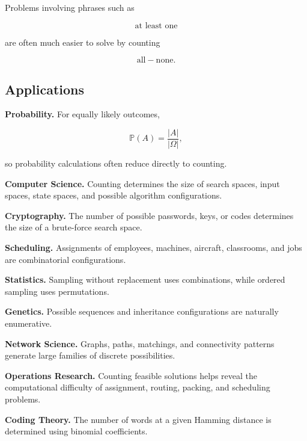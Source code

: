 Problems involving phrases such as

\[
\text{at least one}
\]

are often much easier to solve by counting

\[
\text{all}
-
\text{none}.
\]

\subsection{Applications}
\label{subsec:basic-counting-applications}

\begin{applicationbox}

\textbf{Probability.}
For equally likely outcomes,

\[
\mathbb{P}(A)
=
\frac{|A|}{|\Omega|},
\]

so probability calculations often reduce directly to counting.

\medskip

\textbf{Computer Science.}
Counting determines the size of search spaces, input spaces, state
spaces, and possible algorithm configurations.

\medskip

\textbf{Cryptography.}
The number of possible passwords, keys, or codes determines the size of
a brute-force search space.

\medskip

\textbf{Scheduling.}
Assignments of employees, machines, aircraft, classrooms, and jobs are
combinatorial configurations.

\medskip

\textbf{Statistics.}
Sampling without replacement uses combinations, while ordered sampling
uses permutations.

\medskip

\textbf{Genetics.}
Possible sequences and inheritance configurations are naturally
enumerative.

\medskip

\textbf{Network Science.}
Graphs, paths, matchings, and connectivity patterns generate large
families of discrete possibilities.

\medskip

\textbf{Operations Research.}
Counting feasible solutions helps reveal the computational difficulty
of assignment, routing, packing, and scheduling problems.

\medskip

\textbf{Coding Theory.}
The number of words at a given Hamming distance is determined using
binomial coefficients.

\end{applicationbox}


